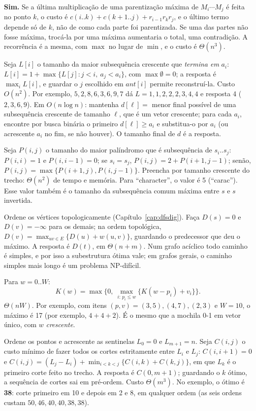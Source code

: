  \textbf{Sim.} Se a última multiplicação de uma parentização máxima de $M_i\cdots M_j$ é feita no ponto $k$, o custo é $c(i..k)+c(k+1..j)+r_{i-1}r_kr_j$, e o último termo depende só de $k$, não de como cada parte foi parentizada. Se uma das partes não fosse máxima, trocá-la por uma máxima aumentaria o total, uma contradição. A recorrência é a mesma, com $\max$ no lugar de $\min$, e o custo é $\Theta(n^3)$.

 Seja $L[i]$ o tamanho da maior subsequência crescente que \emph{termina em} $a_i$: $L[i]=1+\max\{L[j]:j<i,\ a_j<a_i\}$, com $\max\emptyset=0$; a resposta é $\max_iL[i]$, e guardar o $j$ escolhido em $ant[i]$ permite reconstruí-la. Custo $O(n^2)$. Por exemplo, $5,2,8,6,3,6,9,7$ dá $L=1,1,2,2,2,3,4,4$ e resposta 4 ($2,3,6,9$). Em $O(n\log n)$: mantenha $d[\ell]=$ menor final possível de uma subsequência crescente de tamanho $\ell$, que é um vetor crescente; para cada $a_i$, encontre por busca binária o primeiro $d[\ell]\ge a_i$ e substitua-o por $a_i$ (ou acrescente $a_i$ no fim, se não houver). O tamanho final de $d$ é a resposta.

 Seja $P(i,j)$ o tamanho do maior palíndromo que é subsequência de $s_i..s_j$: $P(i,i)=1$ e $P(i,i-1)=0$; se $s_i=s_j$, $P(i,j)=2+P(i+1,j-1)$; senão, $P(i,j)=\max\{P(i+1,j),P(i,j-1)\}$. Preencha por tamanho crescente do trecho: $\Theta(n^2)$ de tempo e memória. Para ``character'', o valor é 5 (``carac''). Esse valor também é o tamanho da subsequência comum máxima entre $s$ e $s$ invertida.

 Ordene os vértices topologicamente (Capítulo~\ref{cap:dfsdig}). Faça $D(s)=0$ e $D(v)=-\infty$ para os demais; na ordem topológica, $D(v)=\max_{uv\in E}\{D(u)+w(u,v)\}$, guardando o predecessor que deu o máximo. A resposta é $D(t)$, em $\Theta(n+m)$. Num grafo acíclico todo caminho é simples, e por isso a subestrutura ótima vale; em grafos gerais, o caminho simples mais longo é um problema NP-difícil.

 Para $w=0..W$: \[K(w)=\max\big\{0,\ \max_{i:\,p_i\le w}\{K(w-p_i)+v_i\}\big\}.\] $\Theta(nW)$. Por exemplo, com itens $(p,v)=(3,5),(4,7),(2,3)$ e $W=10$, o máximo é 17 (por exemplo, $4+4+2$). É o mesmo que a mochila 0-1 em vetor único, com $w$ \emph{crescente}.

 Ordene os pontos e acrescente as sentinelas $L_0=0$ e $L_{m+1}=n$. Seja $C(i,j)$ o custo mínimo de fazer todos os cortes estritamente entre $L_i$ e $L_j$: $C(i,i+1)=0$ e $C(i,j)=(L_j-L_i)+\min_{i<k<j}\{C(i,k)+C(k,j)\}$, em que $L_k$ é o primeiro corte feito no trecho. A resposta é $C(0,m+1)$; guardando o $k$ ótimo, a sequência de cortes sai em pré-ordem. Custo $\Theta(m^3)$. No exemplo, o ótimo é \textbf{38}: corte primeiro em 10 e depois em 2 e 8, em qualquer ordem (as seis ordens custam $50,46,40,40,38,38$).

